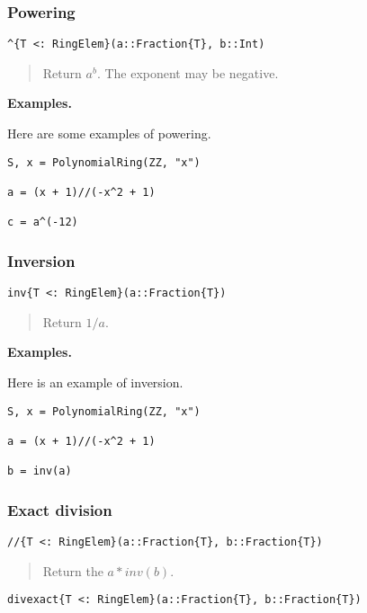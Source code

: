 \documentclass[a4paper,10pt]{article}
\newcommand{\desc}[1]{\vspace{-3mm}\begin{quote}#1\end{quote}}
\begin{document}
\subsubsection{Powering}

\begin{lstlisting}
^{T <: RingElem}(a::Fraction{T}, b::Int)
\end{lstlisting}

\desc{Return $a^b$. The exponent may be negative.}

\textbf{Examples.}

Here are some examples of powering.

\begin{lstlisting}
S, x = PolynomialRing(ZZ, "x")

a = (x + 1)//(-x^2 + 1)

c = a^(-12)
\end{lstlisting}

\subsubsection{Inversion}

\begin{lstlisting}
inv{T <: RingElem}(a::Fraction{T})
\end{lstlisting}

\desc{Return $1/a$.}

\textbf{Examples.}

Here is an example of inversion.

\begin{lstlisting}
S, x = PolynomialRing(ZZ, "x")

a = (x + 1)//(-x^2 + 1)

b = inv(a)
\end{lstlisting}

\subsubsection{Exact division}

\begin{lstlisting}
//{T <: RingElem}(a::Fraction{T}, b::Fraction{T})
\end{lstlisting}

\desc{Return the $a*inv(b)$.}

\begin{lstlisting}
divexact{T <: RingElem}(a::Fraction{T}, b::Fraction{T})
\end{lstlisting}
\end{document}

